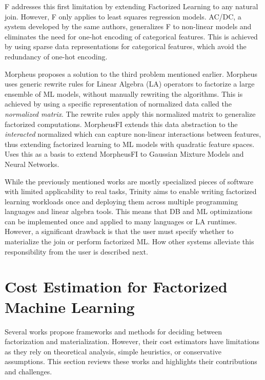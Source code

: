 F \cite{f_schleich} addresses this first limitation by extending Factorized Learning to any natural join. However, F only applies to least squares regression models. AC/DC, a system developed by the same authors, generalizes F to non-linear models and eliminates the need for one-hot encoding of categorical features. This is achieved by using sparse data representations for categorical features, which avoid the redundancy of one-hot encoding.

Morpheus \cite{morpheus} proposes a solution to the third problem mentioned earlier. Morpheus uses generic rewrite rules for Linear Algebra (LA) operators to factorize a large ensemble of ML models, without manually rewriting the algorithms. This is achieved by using a specific representation of normalized data called the \textit{normalized matrix}. The rewrite rules apply this normalized matrix to generalize factorized computations. MorpheusFI \cite{MorpheusFIEnablingOptimizingNonlinear2019} extends this data abstraction to the \textit{interacted} normalized which can capture non-linear interactions between features, thus extending factorized learning to ML models with quadratic feature spaces. \cite{f_gmm_DBLP:conf/icde/ChengKZ021} Uses this as a basis to extend MorpheusFI to Gaussian Mixture Models and Neural Networks.

While the previously mentioned works are mostly specialized pieces of software with limited applicability to real tasks, Trinity \cite{TrinityPolyglotFrameworkFactorized2021} aims to enable writing factorized learning workloads once and deploying them across multiple programming languages and linear algebra tools. This means that DB and ML optimizations can be implemented once and applied to many languages or LA runtimes. However, a significant drawback is that the user must specify whether to materialize the join or perform factorized ML. How other systems alleviate this responsibility from the user is described next.

\section{Cost Estimation for Factorized Machine Learning}
\label{sec:3-cost-estimation-for-factorized-ml}
Several works propose frameworks and methods for deciding between factorization and materialization. However, their cost estimators have limitations as they rely on theoretical analysis, simple heuristics, or conservative assumptions. This section reviews these works and highlights their contributions and challenges.

